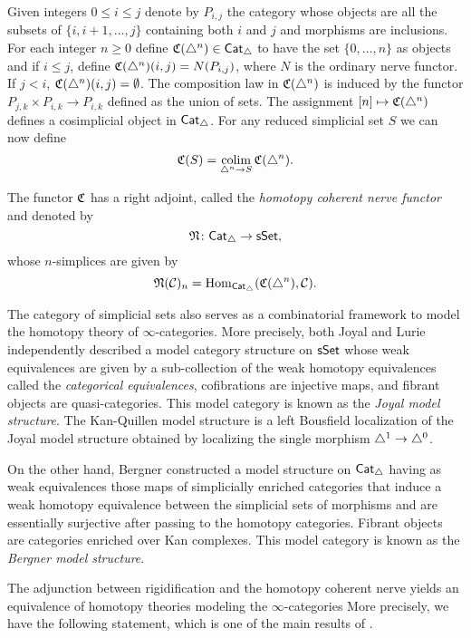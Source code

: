 Given integers $0 \leq i \leq j$ denote by $P_{i,j}$ the category whose objects are all the subsets of $\{i, i+1, \dots, j\}$ containing both $i$ and $j$ and morphisms are inclusions.
For each integer $n \geq 0$ define $\operatorname{\mathfrak{C}}(\triangle^n) \in \mathsf{Cat}_{\triangle}$ to have the set $\{0, \dots, n\}$ as objects and if $i \leq j$, define $\operatorname{\mathfrak{C}}(\triangle^n)(i,j)= N(P_{i,j})$, where $N$ is the ordinary nerve functor.
If $j < i$, $\operatorname{\mathfrak{C}}(\triangle^n)(i,j) = \emptyset$.
The composition law in $\operatorname{\mathfrak{C}}(\triangle^n)$ is induced by the functor $P_{j,k} \times P_{i,k} \to P_{i,k}$ defined as the union of sets.
The assignment $[n] \mapsto \operatorname{\mathfrak{C}}(\triangle^n)$ defines a cosimplicial object in $\mathsf{Cat}_{\triangle}$.
For any reduced simplicial set $S$ we can now define
\[
\operatorname{\mathfrak{C}}(S) = \operatorname*{colim}_{\triangle^n \to S} \operatorname{\mathfrak{C}}(\triangle^n).
\]

The functor $\operatorname{\mathfrak{C}}$ has a right adjoint, called the \textit{homotopy coherent nerve functor} and denoted by
\[
\operatorname{\mathfrak{N}} \colon \mathsf{Cat}_{\triangle} \to \mathsf{sSet},
\]
whose $n$-simplices are given by
\[
\operatorname{\mathfrak{N}}(\mathcal{C})_n = \mathrm{Hom}_{\mathsf{Cat}_{\triangle}}(\operatorname{\mathfrak{C}}(\triangle^n), \mathcal{C}).
\]

The category of simplicial sets also serves as a combinatorial framework to model the homotopy theory of $\infty$-categories.
More precisely, both Joyal and Lurie independently described a model category structure on $\mathsf{sSet}$ whose weak equivalences are given by a sub-collection of the weak homotopy equivalences called the \textit{categorical equivalences}, cofibrations are injective maps, and fibrant objects are quasi-categories.
This model category is known as the \textit{Joyal model structure}.
The Kan-Quillen model structure is a left Bousfield localization of the Joyal model structure obtained by localizing the single morphism $\triangle^1 \to \triangle^0$.

On the other hand, Bergner constructed a model structure on $\mathsf{Cat}_{\triangle}$ having as weak equivalences those maps of simplicially enriched categories that induce a weak homotopy equivalence between the simplicial sets of morphisms and are essentially surjective after passing to the homotopy categories.
Fibrant objects are categories enriched over Kan complexes.
This model category is known as the \textit{Bergner model structure}.

The adjunction between rigidification and the homotopy coherent nerve yields an equivalence of homotopy theories modeling the $\infty$-categories
More precisely, we have the following statement, which is one of the main results of \cite{dugger2011mappingspaces}.

